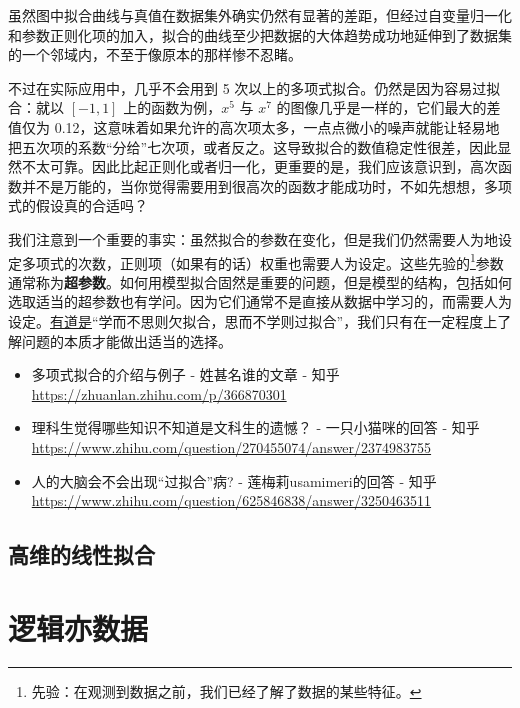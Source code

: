 \documentclass[UTF8, 12pt]{article}
\newcommand{\uhref}[2]{\href{#1}{\underline{#2}}}
\begin{document}
虽然图中拟合曲线与真值在数据集外确实仍然有显著的差距，但经过自变量归一化和参数正则化项的加入，拟合的曲线至少把数据的大体趋势成功地延伸到了数据集的一个邻域内，不至于像原本的那样惨不忍睹。

不过在实际应用中，几乎不会用到 5 次以上的多项式拟合。仍然是因为容易过拟合：就以 $[-1, 1]$ 上的函数为例，$x^5$ 与 $x^7$ 的图像几乎是一样的，它们最大的差值仅为 0.12，这意味着如果允许的高次项太多，一点点微小的噪声就能让轻易地把五次项的系数“分给”七次项，或者反之。这导致拟合的数值稳定性很差，因此显然不太可靠。因此比起正则化或者归一化，更重要的是，我们应该意识到，高次函数并不是万能的，当你觉得需要用到很高次的函数才能成功时，不如先想想，多项式的假设真的合适吗？

我们注意到一个重要的事实：虽然拟合的参数在变化，但是我们仍然需要人为地设定多项式的次数，正则项（如果有的话）权重也需要人为设定。这些先验的\footnote{先验：在观测到数据之前，我们已经了解了数据的某些特征。}参数通常称为\textbf{超参数}。如何用模型拟合固然是重要的问题，但是模型的结构，包括如何选取适当的超参数也有学问。因为它们通常不是直接从数据中学习的，而需要人为设定。\uhref{https://www.zhihu.com/question/625846838/answer/3251736042}{有道是}“学而不思则欠拟合，思而不学则过拟合”，我们只有在一定程度上了解问题的本质才能做出适当的选择。

\begin{tcolorbox}[myrecommendbox, title=推荐阅读, breakable=false]
    \begin{itemize}
        \item 多项式拟合的介绍与例子 - 姓甚名谁的文章 - 知乎\\
              \url{https://zhuanlan.zhihu.com/p/366870301}
        \item 理科生觉得哪些知识不知道是文科生的遗憾？ - 一只小猫咪的回答 - 知乎\\
              \url{https://www.zhihu.com/question/270455074/answer/2374983755}
        \item 人的大脑会不会出现“过拟合”病? - 莲梅莉usamimeri的回答 - 知乎\\
              \url{https://www.zhihu.com/question/625846838/answer/3250463511}
    \end{itemize}
\end{tcolorbox}

\subsection{高维的线性拟合}

\section{逻辑亦数据}
\end{document}
